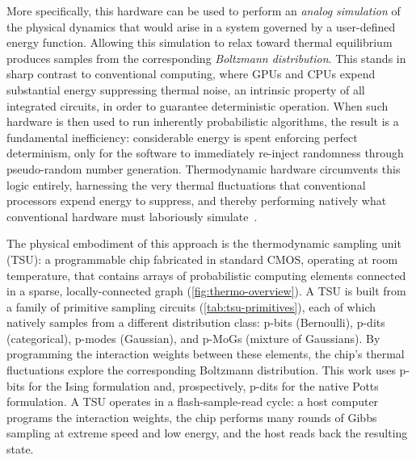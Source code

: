 \documentclass[11pt,twocolumn]{article}
\begin{document}
More specifically, this hardware can be used to perform an \textit{analog simulation} of the physical dynamics that would arise in a system governed by a user-defined energy function.
Allowing this simulation to relax toward thermal equilibrium produces samples from the corresponding \textit{Boltzmann distribution}. This stands in sharp contrast to conventional computing, where
GPUs and CPUs expend substantial energy suppressing thermal noise, an intrinsic property of all integrated circuits, in order to guarantee deterministic operation.
When such hardware is then used to run inherently probabilistic algorithms, the result is a fundamental inefficiency: considerable energy is spent enforcing perfect determinism, only for the software to immediately re-inject randomness through pseudo-random number generation.
Thermodynamic hardware circumvents this logic entirely, harnessing the very thermal fluctuations that conventional processors expend energy to suppress, and thereby performing natively what conventional hardware must laboriously simulate~\cite{jelincic2025dtm}.

The physical embodiment of this approach is the thermodynamic sampling unit (TSU): a programmable chip fabricated in standard CMOS, operating at room temperature, that contains arrays of probabilistic computing elements connected in a sparse, locally-connected graph (\cref{fig:thermo-overview}).
A TSU is built from a family of primitive sampling circuits (\cref{tab:tsu-primitives}), each of which natively samples from a different distribution class: p-bits (Bernoulli), p-dits (categorical), p-modes (Gaussian), and p-MoGs (mixture of Gaussians).
By programming the interaction weights between these elements, the chip's thermal fluctuations explore the corresponding Boltzmann distribution.
This work uses p-bits for the Ising formulation and, prospectively, p-dits for the native Potts formulation.
A TSU operates in a flash-sample-read cycle: a host computer programs the interaction weights, the chip performs many rounds of Gibbs sampling at extreme speed and low energy, and the host reads back the resulting state.
\end{document}
